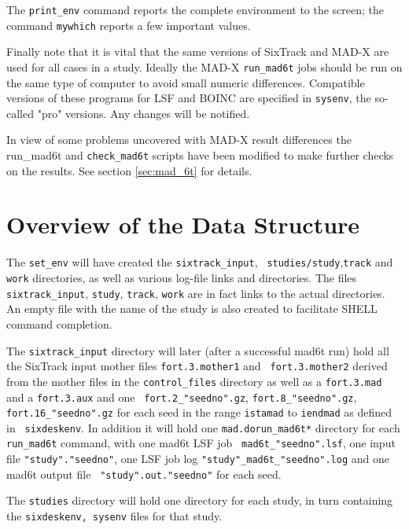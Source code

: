 \documentclass{cernatsnote}
\begin{document}
The \texttt{print\_env} command reports the complete environment to the screen;
the command \texttt{mywhich} reports a few important values.

Finally note that it is vital that the same versions of SixTrack and MAD-X are
used for all cases in a study. Ideally the MAD-X \texttt{run\_mad6t} jobs should
be run on the same type of computer to avoid small numeric differences.
Compatible versions of these programs for LSF and BOINC are specified
in \texttt{sysenv}, the so-called "pro" versions. Any changes will be notified.

In view of some problems uncovered with MAD-X result differences the run_mad6t
and {\tt check\_mad6t} scripts have been modified to make further checks on
the results. See section \ref{sec:mad_6t} for details.

\section{Overview of the Data Structure}

The \texttt{set\_env} will have created the \texttt{sixtrack\_input}, {\tt
studies/study},\texttt{track} and \texttt{work} directories, as well as various
log-file links and directories.  The files \texttt{sixtrack\_input}, \texttt{study},
\texttt{track}, \texttt{work} are in fact links to the actual directories. An empty
file with the name of the study is also created to facilitate SHELL command
completion.

The \texttt{sixtrack\_input} directory will later (after a successful mad6t run)
hold all the SixTrack input mother files \texttt{fort.3.mother1} and {\tt
fort.3.mother2} derived from the mother files in the \texttt{control\_files}
directory as well as a \texttt{fort.3.mad} and a \texttt{fort.3.aux} and one {\tt
fort.2\_"seedno".gz}, \texttt{fort.8\_"seedno".gz}, \texttt{fort.16\_"seedno".gz} for
each seed in the range \texttt{istamad} to \texttt{iendmad} as defined in {\tt
sixdeskenv}. In addition it will hold one \texttt{mad.dorun\_mad6t*} directory for
each \texttt{run\_mad6t} command, with one mad6t LSF job {\tt
mad6t\_"seedno".lsf}, one input file \texttt{"study"."seedno"}, one LSF job log
\texttt{"study"\_mad6t\_"seedno".log} and one mad6t output file {\tt
"study".out."seedno"} for each seed.

The \texttt{studies} directory will hold one directory for each study, in turn
containing the \texttt{sixdeskenv, sysenv} files for that study.
\end{document}
